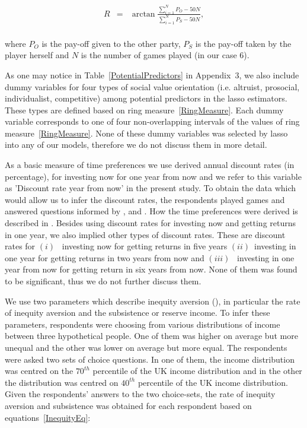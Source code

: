 \documentclass[a4paper,12pt]{article}
\begin{document}
\begin{equation}\label{RingMeasure}
\begin{array}{lcll}

R&=&\arctan \frac{\sum_{i=1}^{N} P_O -50N}{\sum_{i=1}^{N} P_S -50N}, \\
\end{array}
\end{equation}

where $P_O$ is the pay-off given to the other party, $P_S$ is the pay-off taken by the player herself and $N$ is the number of games played (in our case $6$).

As one may notice in Table~\ref{PotentialPredictors} in Appendix~$3$, we also include dummy variables for four types of social value orientation (i.e. altruist, prosocial, individualist, competitive) among potential predictors in the lasso estimators. These types are defined based on ring measure~\eqref{RingMeasure}. Each dummy variable corresponds to one of four non-overlapping intervals of the values of ring measure~\eqref{RingMeasure}. None of these dummy variables was selected by lasso into any of our models, therefore we do not discuss them in more detail.

As a basic measure of time preferences we use derived annual discount rates (in percentage), for investing now for one year from now and we refer to this variable as 'Discount rate year from now' in the present study. To obtain the data which would allow us to infer the discount rates, the respondents played games and answered questions informed by \citet{voors2012violent}, \citet{ifcher2011} and \citet{tanaka2010riskTime}. How the time preferences were derived is described in \cite{SurveyUK}. Besides using discount rates for investing now and getting returns in one year, we also implied other types of discount rates.  These are discount rates for $(i)$~ investing now for getting returns in five years $(ii)$~investing in one year for getting returns in two years from now and $(iii)$~ investing in one year from now for getting return in six years from now. None of them was found to be significant, thus we do not further discuss them.


We use two parameters which describe inequity aversion (\citealp{bergson1938, bergson1954, samuelson1956}), in particular the rate of inequity aversion and the subsistence or reserve income. 
To infer these parameters, respondents were choosing from various distributions of income between three hypothetical people. One of them was higher on average but more unequal and the other was lower on average but more equal. The respondents were asked two sets of choice questions. In one of them, the income distribution was centred on the $70^{th}$ percentile of the UK income distribution and in the other the distribution was centred on $40^{th}$ percentile of the UK income distribution. Given the respondents' answers to the two choice-sets, the rate of inequity aversion and subsistence was obtained for each respondent based on equations~\eqref{InequityEq}:
\end{document}
